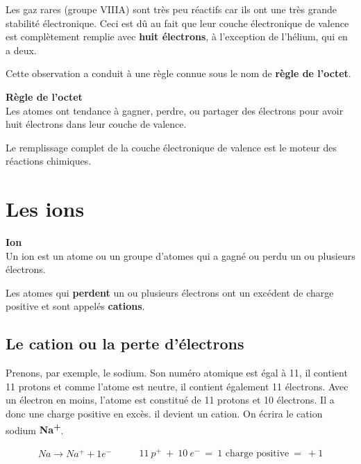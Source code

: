 \documentclass[
  11pt,
  a4paper,
  openany]{book}
\begin{document}
Les gaz rares (groupe VIIIA) sont très peu réactifs car ils ont une très grande stabilité électronique. Ceci est dû au fait que leur couche électronique de valence est complètement remplie avec \textbf{huit électrons}, à l'exception de l'hélium, qui en a deux.

Cette observation a conduit à une règle connue sous le nom de \textbf{règle de l'octet}.

\begin{tcolorbox}
\textbf{Règle de l'octet}\\
Les atomes ont tendance à gagner, perdre, ou partager des électrons pour avoir huit électrons dans leur couche de valence.

\end{tcolorbox}

Le remplissage complet de la couche électronique de valence est le moteur des réactions chimiques.

\hypertarget{les-ions}{%
\section{Les ions}\label{les-ions}}

\begin{tcolorbox}
\textbf{Ion}\\
Un ion est un atome ou un groupe d'atomes qui a gagné ou perdu un ou plusieurs électrons.

\end{tcolorbox}

Les atomes qui \textbf{perdent} un ou plusieurs électrons ont un excédent de charge positive et sont appelés \textbf{cations}.

\hypertarget{le-cation-ou-la-perte-duxe9lectrons}{%
\subsection{Le cation ou la perte d'électrons}\label{le-cation-ou-la-perte-duxe9lectrons}}

Prenons, par exemple, le sodium. Son numéro atomique est égal à 11, il contient 11 protons et comme l'atome est neutre, il contient également 11 électrons. Avec un électron en moins, l'atome est constitué de 11 protons et 10 électrons. Il a donc une charge positive en excès. il devient un cation. On écrira le cation sodium \textbf{Na\textsuperscript{+}}.

\[ \begin{split}
        Na \rightarrow Na^+ + 1e^-
    \end{split}
    \qquad
    \begin{split}
        11\:p^{+}\:+\:10\:e^{-}\:=\:\text{1 charge positive}\:=\:+1
    \end{split} \]
\end{document}

